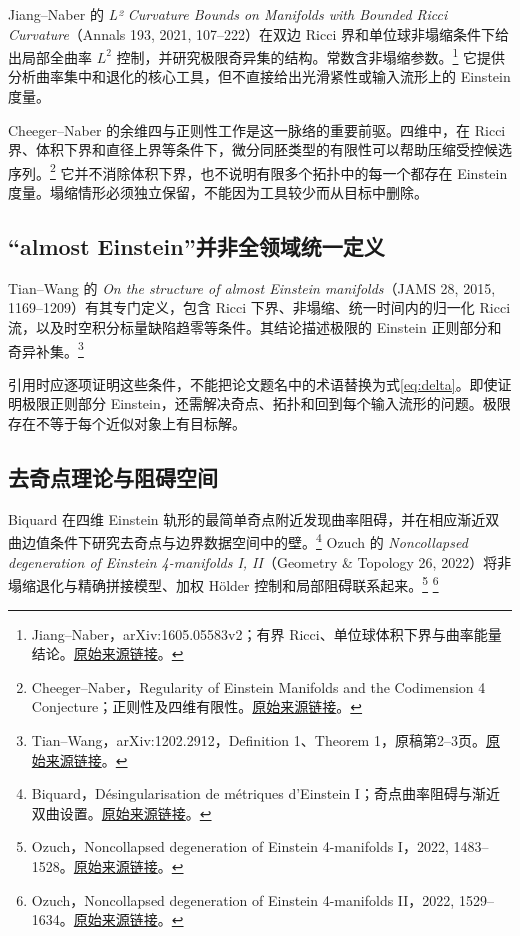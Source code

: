 \documentclass[11pt,a4paper]{article}
\theoremstyle{definition}
\newcommand{\src}[3]{\footnote{\raggedright #1，#2。\href{#3}{原始来源链接}。}}
\begin{document}
Jiang--Naber 的 \emph{L² Curvature Bounds on Manifolds with Bounded Ricci Curvature}（Annals 193, 2021, 107--222）在双边 Ricci 界和单位球非塌缩条件下给出局部全曲率 $L^2$ 控制，并研究极限奇异集的结构。常数含非塌缩参数。\src{Jiang--Naber}{arXiv:1605.05583v2；有界 Ricci、单位球体积下界与曲率能量结论}{https://arxiv.org/abs/1605.05583v2}
它提供分析曲率集中和退化的核心工具，但不直接给出光滑紧性或输入流形上的 Einstein 度量。

Cheeger--Naber 的余维四与正则性工作是这一脉络的重要前驱。四维中，在 Ricci 界、体积下界和直径上界等条件下，微分同胚类型的有限性可以帮助压缩受控候选序列。\src{Cheeger--Naber}{Regularity of Einstein Manifolds and the Codimension 4 Conjecture；正则性及四维有限性}{https://arxiv.org/abs/1406.6534}
它并不消除体积下界，也不说明有限多个拓扑中的每一个都存在 Einstein 度量。塌缩情形必须独立保留，不能因为工具较少而从目标中删除。

\subsection{“almost Einstein”并非全领域统一定义}

Tian--Wang 的 \emph{On the structure of almost Einstein manifolds}（JAMS 28, 2015, 1169--1209）有其专门定义，包含 Ricci 下界、非塌缩、统一时间内的归一化 Ricci 流，以及时空积分标量缺陷趋零等条件。其结论描述极限的 Einstein 正则部分和奇异补集。\src{Tian--Wang}{arXiv:1202.2912，Definition 1、Theorem 1，原稿第2--3页}{https://arxiv.org/abs/1202.2912}

引用时应逐项证明这些条件，不能把论文题名中的术语替换为式\eqref{eq:delta}。即使证明极限正则部分 Einstein，还需解决奇点、拓扑和回到每个输入流形的问题。极限存在不等于每个近似对象上有目标解。

\subsection{去奇点理论与阻碍空间}

Biquard 在四维 Einstein 轨形的最简单奇点附近发现曲率阻碍，并在相应渐近双曲边值条件下研究去奇点与边界数据空间中的壁。\src{Biquard}{Désingularisation de métriques d'Einstein I；奇点曲率阻碍与渐近双曲设置}{https://arxiv.org/abs/1105.4904}
Ozuch 的 \emph{Noncollapsed degeneration of Einstein 4-manifolds I, II}（Geometry \& Topology 26, 2022）将非塌缩退化与精确拼接模型、加权 Hölder 控制和局部阻碍联系起来。\src{Ozuch}{Noncollapsed degeneration of Einstein 4-manifolds I，2022, 1483--1528}{https://doi.org/10.2140/gt.2022.26.1483}
\src{Ozuch}{Noncollapsed degeneration of Einstein 4-manifolds II，2022, 1529--1634}{https://doi.org/10.2140/gt.2022.26.1529}
\end{document}
